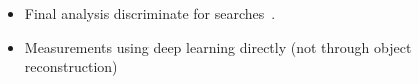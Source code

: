 \documentclass[12pt,letterpaper]{article}
\begin{document}
\begin{itemize}
\begin{itemize}
		\item Final analysis discriminate for searches~\cite{Ali:2025gni,CMS:2025bxo,CMS:2025dpp,Sahoo:2025gig,Li:2025hbv,Manganelli:2022whv,Sirunyan:2020hwz,collaboration2020dijet,Aad:2020hzm,Aad:2019yxi}.
		\item Measurements using deep learning directly (not through object reconstruction)~\cite{H1:2023fzk,H1:2021wkz}
	\end{itemize}


\end{itemize}


\clearpage
\flushbottom
%


\end{document}
